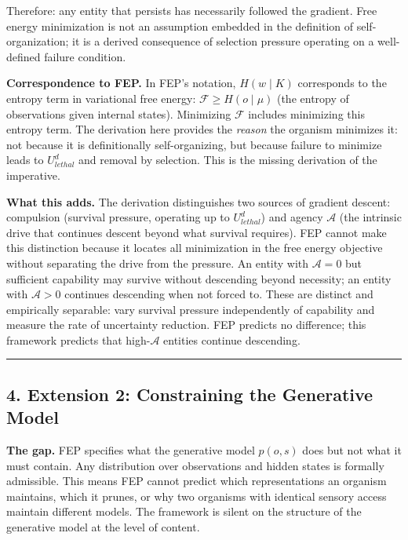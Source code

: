 \documentclass[
]{article}
\begin{document}
Therefore: any entity that persists has necessarily followed the
gradient. Free energy minimization is not an assumption embedded in the
definition of self-organization; it is a derived consequence of
selection pressure operating on a well-defined failure condition.

\textbf{Correspondence to FEP.} In FEP's notation, \(H(w \mid K)\)
corresponds to the entropy term in variational free energy:
\(\mathcal{F} \geq H(o \mid \mu)\) (the entropy of observations given
internal states). Minimizing \(\mathcal{F}\) includes minimizing this
entropy term. The derivation here provides the \emph{reason} the
organism minimizes it: not because it is definitionally self-organizing,
but because failure to minimize leads to \(U_{lethal}^d\) and removal by
selection. This is the missing derivation of the imperative.

\textbf{What this adds.} The derivation distinguishes two sources of
gradient descent: compulsion (survival pressure, operating up to
\(U_{lethal}^d\)) and agency \(\mathcal{A}\) (the intrinsic drive that
continues descent beyond what survival requires). FEP cannot make this
distinction because it locates all minimization in the free energy
objective without separating the drive from the pressure. An entity with
\(\mathcal{A} = 0\) but sufficient capability may survive without
descending beyond necessity; an entity with \(\mathcal{A} > 0\)
continues descending when not forced to. These are distinct and
empirically separable: vary survival pressure independently of
capability and measure the rate of uncertainty reduction. FEP predicts
no difference; this framework predicts that high-\(\mathcal{A}\)
entities continue descending.

\begin{center}\rule{0.5\linewidth}{0.5pt}\end{center}

\subsection{4. Extension 2: Constraining the Generative
Model}\label{extension-2-constraining-the-generative-model}

\textbf{The gap.} FEP specifies what the generative model \(p(o, s)\)
does but not what it must contain. Any distribution over observations
and hidden states is formally admissible. This means FEP cannot predict
which representations an organism maintains, which it prunes, or why two
organisms with identical sensory access maintain different models. The
framework is silent on the structure of the generative model at the
level of content.
\end{document}
